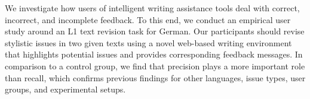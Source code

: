 We investigate how users of intelligent writing assistance tools deal with correct, incorrect, and incomplete feedback. To this end, we conduct an empirical user study around an L1 text revision task for German. Our participants should revise stylistic issues in two given texts using a novel web-based writing environment that highlights potential issues and provides corresponding feedback messages. In comparison to a control group, we find that precision plays a more important role than recall, which confirms previous findings for other languages, issue types, user groups, and experimental setups.
